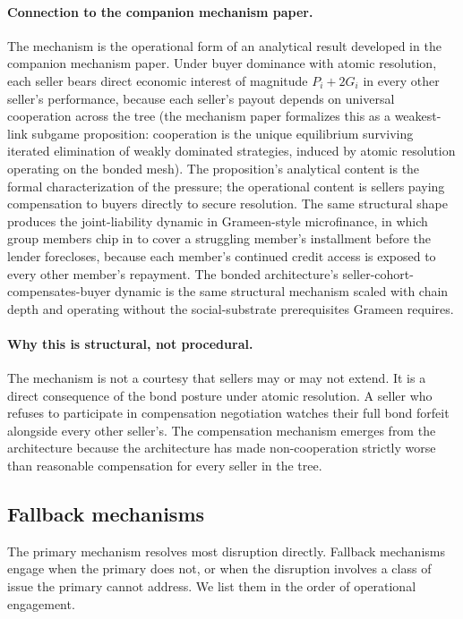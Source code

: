 \documentclass[11pt,a4paper]{article}
\theoremstyle{definition}
\theoremstyle{remark}
\begin{document}
\paragraph{Connection to the companion mechanism paper.}
The mechanism is the operational form of an analytical result
developed in the companion mechanism paper. Under buyer dominance
with atomic resolution, each seller bears direct economic
interest of magnitude $P_i + 2G_i$ in every other seller's
performance, because each seller's payout depends on universal
cooperation across the tree (the mechanism paper formalizes this
as a weakest-link subgame proposition: cooperation is the unique
equilibrium surviving iterated elimination of weakly dominated
strategies, induced by atomic resolution operating on the bonded
mesh). The proposition's analytical content is the formal
characterization of the pressure; the operational content is
sellers paying compensation to buyers directly to secure
resolution. The same structural shape produces the joint-liability
dynamic in Grameen-style microfinance, in which group members
chip in to cover a struggling member's installment before the
lender forecloses, because each member's continued credit access
is exposed to every other member's repayment. The bonded
architecture's seller-cohort-compensates-buyer dynamic is the
same structural mechanism scaled with chain depth and operating
without the social-substrate prerequisites Grameen requires.

\paragraph{Why this is structural, not procedural.}
The mechanism is not a courtesy that sellers may or may not
extend. It is a direct consequence of the bond posture under
atomic resolution. A seller who refuses to participate in
compensation negotiation watches their full bond forfeit
alongside every other seller's. The compensation mechanism
emerges from the architecture because the architecture has made
non-cooperation strictly worse than reasonable compensation for
every seller in the tree.

\subsection{Fallback mechanisms}

The primary mechanism resolves most disruption directly. Fallback
mechanisms engage when the primary does not, or when the
disruption involves a class of issue the primary cannot address.
We list them in the order of operational engagement.
\end{document}
